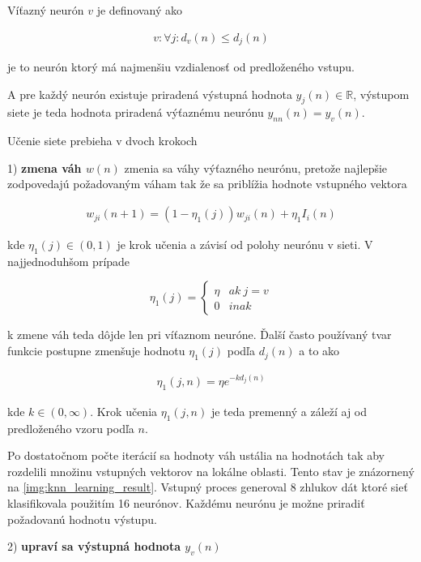Víťazný neurón $v$ je definovaný ako

\begin{align}
v : \forall j : d_v(n) \leq d_j(n)
\label{eq:knn_winning}
\end{align}

je to neurón ktorý má najmenšiu vzdialenosť od predloženého vstupu.

A pre každý neurón existuje priradená výstupná hodnota $y_j(n) \in \mathbb{R}$, výstupom
siete je teda hodnota priradená výťaznému neurónu $y_{nn}(n) = y_v(n)$.


Učenie siete prebieha v dvoch krokoch

{1) \bf zmena váh $w(n)$ } zmenia sa váhy výťazného neurónu, pretože najlepšie
zodpovedajú požadovaným váham tak že sa priblížia hodnote vstupného vektora

\begin{align}
w_{ji}(n+1) = (1-\eta_1(j))w_{ji}(n) + \eta_1 I_i(n)
\label{eq:knn_w_update}
\end{align}

kde $\eta_1(j) \in (0, 1)$ je krok učenia a závisí od polohy neurónu v sieti.
V najjednoduhšom prípade

\begin{equation}
\eta_1(j) =
\left\{
	\begin{array}{ll}
		\eta  & ak \ j = v \\
		0 & inak
	\end{array}
\right.
\label{eq:knn_func_simple1}
\end{equation}

k zmene váh teda dôjde len pri víťaznom neuróne.
Ďalší často používaný tvar funkcie postupne zmenšuje hodnotu $\eta_1(j)$ podľa
$d_j(n)$ a to ako

\begin{align}
\eta_1(j, n) = \eta e^{-kd_j(n)}
\label{eq:knn_func_simple2}
\end{align}

kde $k \in (0, \infty )$. Krok učenia $\eta_1(j, n)$ je teda premenný a záleží
aj od predloženého vzoru podľa $n$.

Po dostatočnom počte iterácií sa hodnoty váh ustália na hodnotách tak aby rozdelili
množinu vstupných vektorov na lokálne oblasti. Tento stav je znázornený na \ref{img:knn_learning_result}.
Vstupný proces generoval 8 zhlukov dát ktoré sieť klasifikovala použitím 16 neurónov.
Každému neurónu je možne priradiť požadovanú hodnotu výstupu.

{2) \bf upraví sa výstupná hodnota $y_v(n)$}

